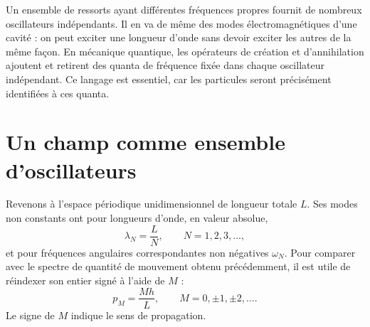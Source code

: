 \begin{classroomqa}
\end{classroomqa}

Un ensemble de ressorts ayant différentes fréquences propres fournit de nombreux oscillateurs indépendants. Il en va de même des modes électromagnétiques d’une cavité : on peut exciter une longueur d’onde sans devoir exciter les autres de la même façon. En mécanique quantique, les opérateurs de création et d’annihilation ajoutent et retirent des quanta de fréquence fixée dans chaque oscillateur indépendant. Ce langage est essentiel, car les particules seront précisément identifiées à ces quanta.

\section{Un champ comme ensemble d’oscillateurs}

Revenons à l’espace périodique unidimensionnel de longueur totale \(L\). Ses modes non constants ont pour longueurs d’onde, en valeur absolue,
\begin{equation}
\lambda_N=\frac{L}{N},
\qquad N=1,2,3,\ldots ,
\end{equation}
et pour fréquences angulaires correspondantes non négatives \(\omega_N\). Pour comparer avec le spectre de quantité de mouvement obtenu précédemment, il est utile de réindexer son entier signé à l’aide de \(M\) :
\begin{equation}
p_M=\frac{Mh}{L},
\qquad M=0,\pm1,\pm2,\ldots .
\end{equation}
Le signe de \(M\) indique le sens de propagation.

